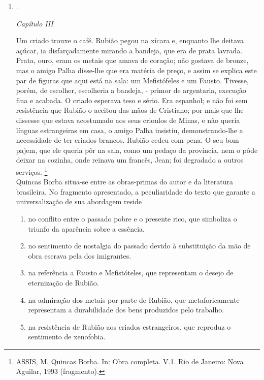 \documentclass[10pt,a4paper]{article}
\begin{document}
\begin{multicols}{2}
\begin{enumerate}
	\item .
		 \begin{center} \emph{Cap\'itulo III} \end{center}
		Um criado trouxe o caf\'e. Rubi\~ao pegou na x\'icara e, enquanto lhe deitava a\c{c}\'ucar, ia disfar\c{c}adamente mirando a bandeja, que era de prata lavrada. Prata, ouro, eram os metais que amava de cora\c{c}\~ao; n\~ao gostava de bronze, mas o amigo Palha disse-lhe que era mat\'eria de pre\c{c}o, e assim se explica este par de figuras que aqui est\'a na sala: um Mefist\'ofeles e um Fausto. Tivesse, por\'em, de escolher, escolheria a bandeja, - primor de argentaria, execu\c{c}\~ao fina e acabada. O criado esperava teso e s\'erio. Era espanhol; e n\~ao foi sem resist\^encia que Rubi\~ao o aceitou das m\~aos de Cristiano; por mais que lhe dissesse que estava acostumado aos seus crioulos de Minas, e n\~ao queria l\'inguas estrangeiras em casa, o amigo Palha insistiu, demonstrando-lhe a necessidade de ter criados brancos. Rubi\~ao cedeu com pena. O seu bom pajem, que ele queria p\^or na sala, como um peda\c{c}o da prov\'incia, nem o p\^ode deixar na cozinha, onde reinava um franc\^es, Jean; foi degradado a outros servi\c{c}os. \footnote{ASSIS, M. Quincas Borba. In: Obra completa. V.1. Rio de Janeiro: Nova Aguilar, 1993
(fragmento).}\\

		Quincas Borba situa-se entre as obras-primas do autor e da literatura brasileira. No fragmento apresentado, a peculiaridade do texto que garante a universaliza\c{c}\~ao de sua abordagem reside

		\begin{enumerate}
		\item no conflito entre o passado pobre e o presente rico, que simboliza o triunfo da apar\^encia sobre a ess\^encia.
		\item no sentimento de nostalgia do passado devido \`a substitui\c{c}\~ao da m\~ao de obra escrava pela dos imigrantes.
		\item na refer\^encia a Fausto e Mefist\'oteles, que representam o desejo de eterniza\c{c}\~ao de Rubi\~ao.
		\item na admira\c{c}\~ao dos metais por parte de Rubi\~ao, que metaforicamente representam a durabilidade dos bens produzidos pelo trabalho.
		\item na resist\^encia de Rubi\~ao aos criados estrangeiros, que reproduz o sentimento de xenofobia.
		\end{enumerate}



\end{enumerate}
\end{multicols}
\end{document}

